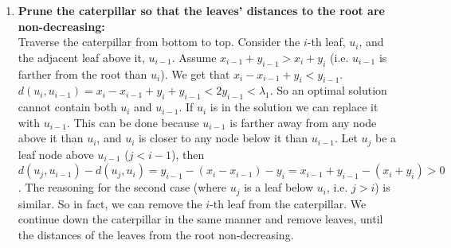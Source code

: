 \documentclass[11pt,a4paper]{article}
\theoremstyle{definition}
\theoremstyle{remark}
\begin{document}
\begin{enumerate}
\item\label{making distances from the root monotone}
\textbf{Prune the caterpillar so that the leaves' distances to the root are non-decreasing:}\\
Traverse the caterpillar from bottom to top. Consider the $i$-th leaf, $u_i$, and the adjacent leaf above it, $u_{i-1}$. Assume $x_{i-1}+y_{i-1} > x_i+y_i$ (i.e. $u_{i-1}$ is farther from the root than $u_i$). We get that $x_i-x_{i-1}+y_i < y_{i-1}$. $d(u_i,u_{i-1}) = x_i-x_{i-1}+y_i+y_{i-1} < 2y_{i-1} < \lambda_1$. So an optimal solution cannot contain both $u_{i}$ and $u_{i-1}$. If $u_{i}$ is in the solution we can replace it with $u_{i-1}$. This can be done because $u_{i-1}$ is farther away from any node above it than $u_i$, and $u_i$ is closer to any node below it than $u_{i-1}$. Let $u_j$ be a leaf node above $u_{i-1}$ ($j<i-1$), then $d(u_j,u_{i-1}) - d(u_j,u_{i}) = y_{i-1}-(x_i-x_{i-1})-y_i = x_{i-1}+y_{i-1}-(x_i+y_i) > 0$. The reasoning for the second case (where $u_j$ is a leaf below $u_i$, i.e. $j>i$) is similar. So in fact, we can remove the $i$-th leaf from the caterpillar. We continue down the caterpillar in the same manner and remove leaves, until the distances of the leaves from the root non-decreasing.


\end{enumerate}
\end{document}
